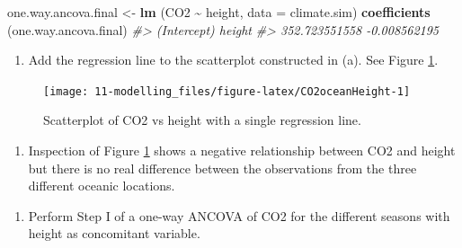 \documentclass[
]{book}
\newenvironment{Shaded}{\begin{snugshade}}{\end{snugshade}}
\newcommand{\AttributeTok}[1]{\textcolor[rgb]{0.13,0.29,0.53}{#1}}
\newcommand{\CommentTok}[1]{\textcolor[rgb]{0.56,0.35,0.01}{\textit{#1}}}
\newcommand{\FunctionTok}[1]{\textcolor[rgb]{0.13,0.29,0.53}{\textbf{#1}}}
\newcommand{\NormalTok}[1]{#1}
\newcommand{\OtherTok}[1]{\textcolor[rgb]{0.56,0.35,0.01}{#1}}
\newcommand{\SpecialCharTok}[1]{\textcolor[rgb]{0.81,0.36,0.00}{\textbf{#1}}}
\providecommand{\tightlist}{%
  \setlength{\itemsep}{0pt}\setlength{\parskip}{0pt}}
\begin{document}
\begin{Shaded}
\begin{Highlighting}[]
\NormalTok{one.way.ancova.final }\OtherTok{\textless{}{-}} \FunctionTok{lm}\NormalTok{ (CO2 }\SpecialCharTok{\textasciitilde{}}\NormalTok{ height, }\AttributeTok{data =}\NormalTok{ climate.sim)}
\FunctionTok{coefficients}\NormalTok{ (one.way.ancova.final)}
\CommentTok{\#\textgreater{}   (Intercept)        height }
\CommentTok{\#\textgreater{} 352.723551558  {-}0.008562195}
\end{Highlighting}
\end{Shaded}

\begin{enumerate}
\def\labelenumi{(\roman{enumi})}
\setcounter{enumi}{1}
\tightlist
\item
  Add the regression line to the scatterplot constructed in (a). See Figure \ref{fig:CO2oceanHeight}.
\end{enumerate}

\begin{figure}
\texttt{[image: 11-modelling\_files/figure-latex/CO2oceanHeight-1]} \caption{Scatterplot of CO2 vs height with a single regression line.}\label{fig:CO2oceanHeight}
\end{figure}

\begin{enumerate}
\def\labelenumi{(\roman{enumi})}
\setcounter{enumi}{2}
\tightlist
\item
  Inspection of Figure \ref{fig:CO2oceanHeight} shows a negative relationship between CO2 and height but there is no real difference between the observations from the three different oceanic locations.
\end{enumerate}

\begin{enumerate}
\def\labelenumi{(\alph{enumi})}
\setcounter{enumi}{3}
\tightlist
\item
  Perform Step I of a one-way ANCOVA of CO2 for the different seasons with height as concomitant variable.
\end{enumerate}
\end{document}
